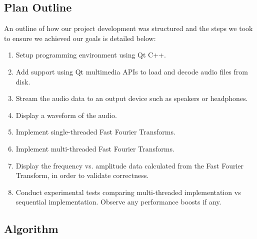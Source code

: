 \documentclass[journal]{IEEEtran}
\begin{document}
\subsection{Plan Outline}

\par{
	An outline of how our project development was structured and the steps we took
	to ensure we achieved our goals is detailed below:
}
\begin{enumerate}
	\item Setup programming environment using Qt C++.
	\item Add support using Qt multimedia APIs to load and decode audio files from disk.
	\item Stream the audio data to an output device such as speakers or headphones.
	\item Display a waveform of the audio.
	\item Implement single-threaded Fast Fourier Transforms.
	\item Implement multi-threaded Fast Fourier Transforms.
	\item Display the frequency vs. amplitude data calculated from the Fast Fourier Transform, in order to validate correctness.
	\item Conduct experimental tests comparing multi-threaded implementation vs sequential implementation. 
Observe any performance boosts if any.
\end{enumerate}

\subsection{Algorithm}\label{Algorithm}
\end{document}
